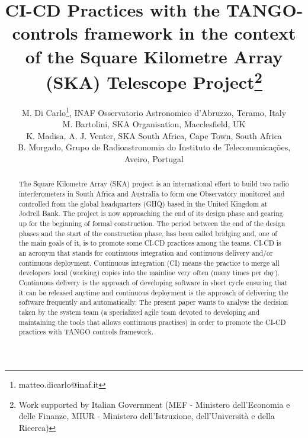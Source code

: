 \documentclass[a4paper,
               keeplastbox,   %
               ]{jacow}
\begin{document}
\title{CI-CD Practices with the TANGO-controls framework in the context of the Square Kilometre Array (SKA) Telescope Project\thanks{Work supported by Italian Government (MEF - Ministero dell'Economia e delle Finanze, MIUR - Ministero dell'Istruzione, dell'Università e della Ricerca)}}

\author{M. Di Carlo\thanks{matteo.dicarlo@inaf.it}, INAF Osservatorio Astronomico d'Abruzzo, Teramo, Italy \\
		M. Bartolini, SKA Organisation, Macclesfield, UK \\
		K. Madisa, A. J. Venter, SKA South Africa, Cape Town, South Africa \\
		B. Morgado, Grupo de Radioastronomia do Instituto de Telecomunicações, Aveiro, Portugal
		}
	
\maketitle

%
\begin{abstract}
   The Square Kilometre Array (SKA) project is an international effort to build two radio interferometers in South Africa and Australia to form one Observatory monitored and controlled from the global headquarters (GHQ) based in the United Kingdom at Jodrell Bank. The project is now approaching the end of its design phase and gearing up for the beginning of formal construction. The period between the end of the design phases and the start of the construction phase, has been called bridging and, one of the main goals of it, is to promote some CI-CD practices among the teams. CI-CD is an acronym that stands for continuous integration and continuous delivery and/or continuous deployment. Continuous integration (CI) means the practice to merge all developers local (working) copies into the mainline very often (many times per day). Continuous delivery is the approach of developing software in short cycle ensuring that it can be released anytime and continuous deployment is the approach of delivering the software frequently and automatically. The present paper wants to analyse the decision taken by the system team (a specialized agile team devoted to developing and maintaining the tools that allows continuous practises) in order to promote the CI-CD practices with TANGO controls framework. 

\end{abstract}
\end{document}
